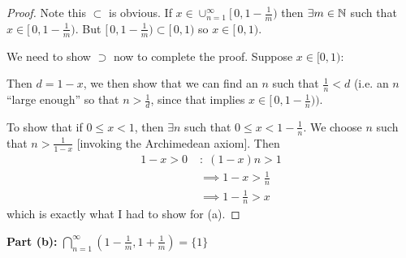 \documentclass[twoside]{scrartcl}
\begin{document}
\begin{proof}
Note this $\subset$ is obvious. If $x \in \cup_{n=1}^{\infty} [\,0, 1-\frac{1}{m})$ then $\exists m \in \mathbb{N}$ such that $x \in [\,0, 1- \frac{1}{m})$. But $[\,0, 1- \frac{1}{m}) \subset [\,0,1)$ so $x \in [\,0,1)$.

We need to show $\supset$ now to complete the proof. Suppose $x \in [0,1):$

\begin{center}
\end{center}

Then $d = 1-x$, we then show that we can find an $n$ such that $\frac{1}{n} < d$ (i.e. an $n$ ``large enough'' so that $ n > \frac{1}{d}$, since that implies $ x \in [\,0, 1- \frac{1}{n}) )$. 

To show that if $0 \leq x < 1 $, then $\exists n$ such that $0 \leq x < 1 - \frac{1}{n}$. We choose $n$ such that $ n > \frac{1}{1 - x}$ [invoking the Archimedean axiom]. Then 
\[\begin{aligned}
1-x>0 \; &: \; (1-x)n > 1\\
 &\implies 1-x > \frac{1}{n}\\
 &\implies1- \frac{1}{n} > x
\end{aligned}\]
which is exactly what I had to show for (a). 
\end{proof}



\textbf{Part (b):} ${\bigcap_{n=1}^{\infty} (1-\frac{1}{m}, 1+ \frac{1}{m}) = \{1\}}$ \\ 
\end{document}
